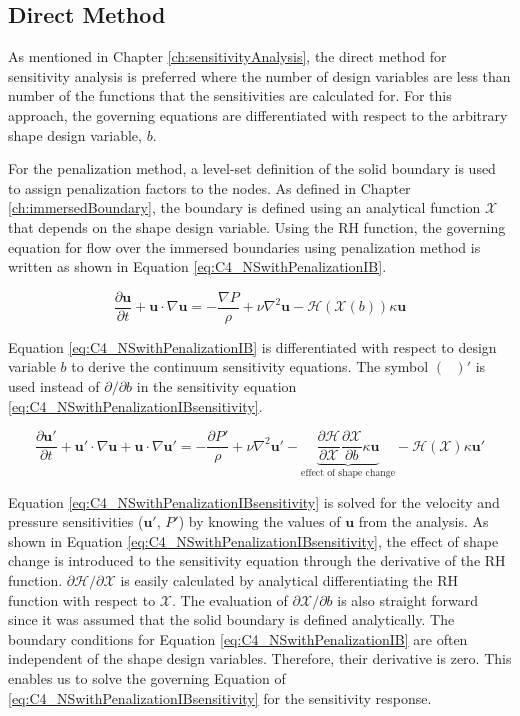 \subsection{Direct Method}
As mentioned in Chapter \ref{ch:sensitivityAnalysis}, the direct method for sensitivity analysis is preferred where the number of design variables are less than number of the functions that the sensitivities are calculated for. For this approach, the governing equations are differentiated with respect to the arbitrary shape design variable, $b$.

For the penalization method, a level-set definition of the solid boundary is used to assign penalization factors to the nodes. As defined in Chapter \ref{ch:immersedBoundary}, the boundary is defined using an analytical function $\mathcal{X}$ that depends on the shape design variable. Using the RH function, the governing equation for flow over the immersed boundaries using penalization method is written as shown in Equation \eqref{eq:C4_NSwithPenalizationIB}.

\begin{equation}\label{eq:C4_NSwithPenalizationIB}
	\frac{\partial \mathbf{u}}{\partial t} + \mathbf{u} \cdot \nabla \mathbf{u} = 
	-\frac{\nabla P}{\rho} + \nu \nabla^2 \mathbf{u} -\mathcal{H}(\mathcal{X}(b)) \kappa \mathbf{u}
\end{equation}

Equation \eqref{eq:C4_NSwithPenalizationIB} is differentiated with respect to design variable $b$ to derive the continuum sensitivity equations. The symbol $(\text{ })'$ is used instead of $\partial /\partial b$ in the sensitivity equation \eqref{eq:C4_NSwithPenalizationIBsensitivity}.

\begin{equation}\label{eq:C4_NSwithPenalizationIBsensitivity}
	\frac{\partial \mathbf{u}'}{\partial t} +
	\mathbf{u}' \cdot \nabla \mathbf{u} + \mathbf{u} \cdot \nabla \mathbf{u}' = 
	-\frac{\partial P'}{\rho} + 
	\nu \nabla^2 \mathbf{u}' - 
	\underbrace{\frac{\partial \mathcal{H}}{\partial \mathcal{X}} \frac{\partial \mathcal{X}}{\partial b} \kappa \mathbf{u}}_\text{effect of shape change} - 
	\mathcal{H}(\mathcal{X}) \kappa \mathbf{u}'
\end{equation}

Equation \eqref{eq:C4_NSwithPenalizationIBsensitivity} is solved for the velocity and pressure sensitivities ($\mathbf{u}'$, $P'$) by knowing the values of $\mathbf{u}$ from the analysis. As shown in Equation \eqref{eq:C4_NSwithPenalizationIBsensitivity}, the effect of shape change is introduced to the sensitivity equation through the derivative of the RH function. $\partial \mathcal{H}/\partial \mathcal{X}$ is easily calculated by analytical differentiating the RH function with respect to $\mathcal{X}$. The evaluation of $\partial \mathcal{X}/\partial b$ is also straight forward since it was assumed that the solid boundary is defined analytically. The boundary conditions for Equation \eqref{eq:C4_NSwithPenalizationIB} are often independent of the shape design variables. Therefore, their derivative is zero. This enables us to solve the governing Equation of \eqref{eq:C4_NSwithPenalizationIBsensitivity} for the sensitivity response.

